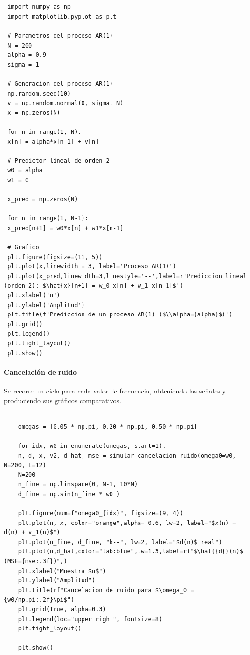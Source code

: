 \documentclass[a4paper]{article}
\begin{document}
 \begin{lstlisting}[caption={Librerias utilizadas}, label={lst:wiener_ar1}]
 	
 	
 import numpy as np
 import matplotlib.pyplot as plt
 
 # Parametros del proceso AR(1)
 N = 200
 alpha = 0.9
 sigma = 1
 
 # Generacion del proceso AR(1)
 np.random.seed(10)
 v = np.random.normal(0, sigma, N)
 x = np.zeros(N)
 
 for n in range(1, N):
 x[n] = alpha*x[n-1] + v[n]
 
 # Predictor lineal de orden 2
 w0 = alpha
 w1 = 0
 
 x_pred = np.zeros(N)
 
 for n in range(1, N-1):
 x_pred[n+1] = w0*x[n] + w1*x[n-1]
 
 # Grafico
 plt.figure(figsize=(11, 5))
 plt.plot(x,linewidth = 3, label='Proceso AR(1)')
 plt.plot(x_pred,linewidth=3,linestyle='--',label=r'Prediccion lineal (orden 2): $\hat{x}[n+1] = w_0 x[n] + w_1 x[n-1]$')
 plt.xlabel('n')
 plt.ylabel('Amplitud')
 plt.title(f'Prediccion de un proceso AR(1) ($\\alpha={alpha}$)')
 plt.grid()
 plt.legend()
 plt.tight_layout()
 plt.show()
  \end{lstlisting} 
 
 \paragraph{Cancelación de ruido }
 

 Se recorre un ciclo para cada valor de frecuencia, obteniendo las señales y produciendo sus gráficos comparativos.
 
 \begin{lstlisting}[caption={Librerias utilizadas}, label={lst:wiener_ar1}]
 	
 	omegas = [0.05 * np.pi, 0.20 * np.pi, 0.50 * np.pi]
 	
 	for idx, w0 in enumerate(omegas, start=1):
 	n, d, x, v2, d_hat, mse = simular_cancelacion_ruido(omega0=w0, N=200, L=12)
 	N=200
 	n_fine = np.linspace(0, N-1, 10*N)
 	d_fine = np.sin(n_fine * w0 )
 	
 	plt.figure(num=f"omega0_{idx}", figsize=(9, 4))
 	plt.plot(n, x, color="orange",alpha= 0.6, lw=2, label="$x(n) = d(n) + v_1(n)$")
 	plt.plot(n_fine, d_fine, "k--", lw=2, label="$d(n)$ real")
 	plt.plot(n,d_hat,color="tab:blue",lw=1.3,label=rf"$\hat{{d}}(n)$ (MSE={mse:.3f})",)
 	plt.xlabel("Muestra $n$")
 	plt.ylabel("Amplitud")
 	plt.title(rf"Cancelacion de ruido para $\omega_0 = {w0/np.pi:.2f}\pi$")
 	plt.grid(True, alpha=0.3)
 	plt.legend(loc="upper right", fontsize=8)
 	plt.tight_layout()
 	
 	plt.show()
 	
 \end{lstlisting}
 
\end{document}
